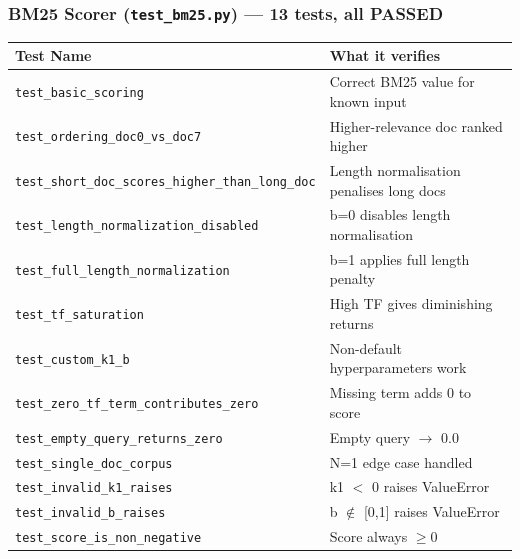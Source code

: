 \documentclass[12pt]{article}
\begin{document}
\subsubsection*{BM25 Scorer (\texttt{test\_bm25.py}) --- 13 tests, all PASSED}
\begin{table}[H]
\centering
\footnotesize
\begin{tabular}{|p{7cm}|p{7.5cm}|}
\hline
\textbf{Test Name} & \textbf{What it verifies} \\
\hline
\texttt{test\_basic\_scoring}                              & Correct BM25 value for known input \\
\texttt{test\_ordering\_doc0\_vs\_doc7}                   & Higher-relevance doc ranked higher \\
\texttt{test\_short\_doc\_scores\_higher\_than\_long\_doc} & Length normalisation penalises long docs \\
\texttt{test\_length\_normalization\_disabled}             & b=0 disables length normalisation \\
\texttt{test\_full\_length\_normalization}                 & b=1 applies full length penalty \\
\texttt{test\_tf\_saturation}                             & High TF gives diminishing returns \\
\texttt{test\_custom\_k1\_b}                              & Non-default hyperparameters work \\
\texttt{test\_zero\_tf\_term\_contributes\_zero}           & Missing term adds 0 to score \\
\texttt{test\_empty\_query\_returns\_zero}                 & Empty query $\to$ 0.0 \\
\texttt{test\_single\_doc\_corpus}                        & N=1 edge case handled \\
\texttt{test\_invalid\_k1\_raises}                        & k1 $<$ 0 raises ValueError \\
\texttt{test\_invalid\_b\_raises}                         & b $\notin$ [0,1] raises ValueError \\
\texttt{test\_score\_is\_non\_negative}                   & Score always $\geq 0$ \\
\hline
\end{tabular}
\end{table}
\end{document}
